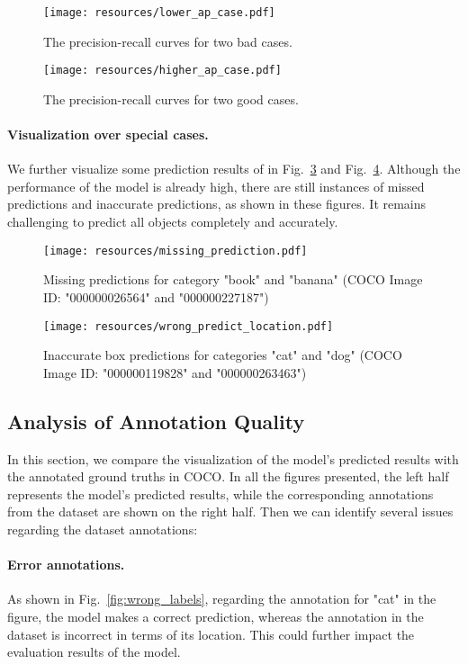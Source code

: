 \documentclass{article}
\begin{document}
\begin{figure}[h]
    \centering
\texttt{[image: resources/lower\_ap\_case.pdf]}
\caption{The precision-recall curves for two bad cases.
    }
    \label{fig:lower_ap_case}
\end{figure} \begin{figure}[ht]
    \centering
\texttt{[image: resources/higher\_ap\_case.pdf]}
\caption{The precision-recall curves for two good cases.
    }
    \label{fig:higher_ap_case}
\end{figure} 
\paragraph{Visualization over special cases.} We further visualize some prediction results of in Fig.~\ref{fig:missing_prediction} and Fig.~\ref{fig:wrong_predict_location}. Although the performance of the model is already high, there are still instances of missed predictions and inaccurate predictions, as shown in these figures. It remains challenging to predict all objects completely and accurately.

\begin{figure}[h]
    \centering
\texttt{[image: resources/missing\_prediction.pdf]}
\caption{Missing predictions for category "book" and "banana" (COCO Image ID: "000000026564" and "000000227187")
    }
    \label{fig:missing_prediction}
\end{figure} \begin{figure}[h]
    \centering
\texttt{[image: resources/wrong\_predict\_location.pdf]}
\caption{Inaccurate box predictions for categories "cat" and "dog" (COCO Image ID: "000000119828" and "000000263463")
    }
    \label{fig:wrong_predict_location}
\end{figure} 
\subsection{Analysis of Annotation Quality}
In this section, we compare the visualization of the model's predicted results with the annotated ground truths in COCO. In all the figures presented, the left half represents the model's predicted results, while the corresponding annotations from the dataset are shown on the right half. Then we can identify several issues regarding the dataset annotations:

\paragraph{Error annotations.} As shown in Fig.~\ref{fig:wrong_labels}, regarding the annotation for "cat" in the figure, the model makes a correct prediction, whereas the annotation in the dataset is incorrect in terms of its location. This could further impact the evaluation results of the model.
\end{document}
